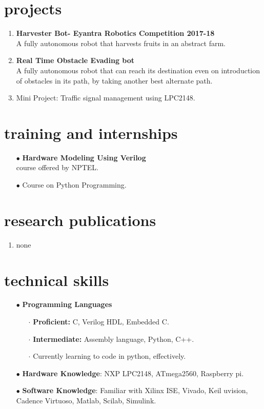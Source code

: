 \documentclass[10pt]{article}
\begin{document}
	\section*{projects}
	\begin{enumerate}
		\item\textbf{Harvester Bot- Eyantra Robotics 		Competition 2017-18}\\
A fully autonomous robot that harvests fruits in an abstract farm.
		\item\textbf{Real Time Obstacle Evading bot}\\
A fully autonomous robot that can reach its destination even on introduction of obstacles in its path, by taking another best alternate path.
		\item Mini Project: Traffic signal management using LPC2148.
	\end{enumerate}
	
	\section*{training and internships}
	\begin{itemize}
		\item[$\bullet$]\textbf{Hardware Modeling Using Verilog }\\
course offered by NPTEL.
		\item[$\bullet$]Course on Python Programming.
	\end{itemize}

	\section*{research publications}
	\begin{enumerate}
		\item none
	\end{enumerate}
	
	\section*{technical skills}
	\begin{itemize}
		\item[$\bullet$]\textbf{Programming Languages }
			\begin{itemize}
				\item[$\cdot$]\textbf{Proficient:} C, Verilog HDL, Embedded C.
				\item[$\cdot$]\textbf{Intermediate:} Assembly language, Python, C++.
				\item[$\cdot$]Currently learning to code in python, effectively.
		\end{itemize}
		\item[$\bullet$]\textbf{Hardware Knowledge}: NXP LPC2148, ATmega2560, Raspberry pi.
		\item[$\bullet$]\textbf{Software Knowledge}: Familiar with Xilinx ISE, Vivado, Keil uvision, Cadence Virtuoso, Matlab, Scilab, Simulink.
	\end{itemize}
\end{document}

